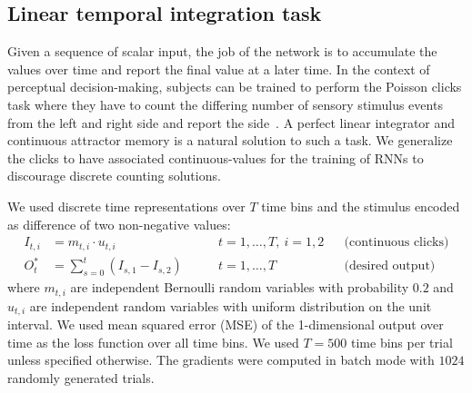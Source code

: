 \documentclass{article} %
\newcounter{ct}
\theoremstyle{definition}
\theoremstyle{remark}
\renewcommand{\cite}{\citep}
\begin{document}
\subsection{Linear temporal integration task}\label{sec:task:continuous-clicks}
Given a sequence of scalar input, the job of the network is to accumulate the values over time and report the final value at a later time.
In the context of perceptual decision-making, subjects can be trained to perform the Poisson clicks task where they have to count the differing number of sensory stimulus events from the left and right side and report the side~\cite{brunton2013}.
A perfect linear integrator and continuous attractor memory is a natural solution to such a task.
We generalize the clicks to have associated continuous-values for the training of RNNs to discourage discrete counting solutions.

We used discrete time representations over $T$ time bins and the stimulus encoded as difference of two non-negative values:
\begin{align}
    I_{t,i} &= m_{t,i} \cdot u_{t,i} 
             \qquad & t=1,\dots, T, \ i=1,2 &&\text{(continuous clicks)}	\label{eq:input}
    \\
    O^\ast_{t} &= \sum_{s=0}^{t} \left(
        I_{s,1} - I_{s,2}
        \right)
            \qquad  & t=1,\dots, T &&  \text{(desired output)} 			\label{eq:output}
\end{align}
where $m_{t,i}$ are independent Bernoulli random variables with probability $0.2$ and $u_{t,i}$ are independent random variables with uniform distribution on the unit interval.
We used mean squared error (MSE) of the 1-dimensional output over time as the loss function over all time bins.
We used $T=500$ time bins per trial unless specified otherwise.
The gradients were computed in batch mode with $1024$ randomly generated trials.


\end{document}
